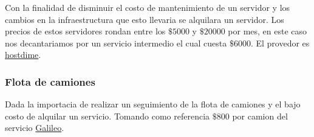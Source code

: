 \documentclass[11pt,a4paper]{article}
\begin{document}
        Con la finalidad de disminuir el costo de mantenimiento de un servidor y los cambios en la infraestructura que esto llevaria se 
        alquilara un servidor. Los precios de estos servidores rondan entre los $\$5000$ y $\$20000$ por mes, en este 
        caso nos decantariamos por un servicio intermedio el cual cuesta $\$6000$. El provedor es \href{https://www.hostdime.com.ar/servidores-dedicados}{hostdime}.

        \subsubsection*{Flota de camiones}

        Dada la importacia de realizar un seguimiento de la flota de camiones y el bajo costo de alquilar un servicio.
        Tomando como referencia $\$800$ por camion del servicio \href{https://galileosatelital.com/rastreo-vehicular-gps}{Galileo}.
        
        



    
\end{document}
